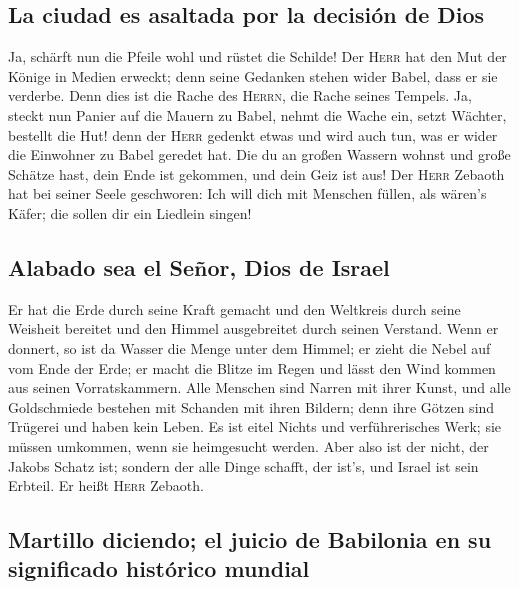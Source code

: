 \hypertarget{la-ciudad-es-asaltada-por-la-decisiuxf3n-de-dios}{%
\subsection{La ciudad es asaltada por la decisión de
Dios}\label{la-ciudad-es-asaltada-por-la-decisiuxf3n-de-dios}}

 Ja, schärft nun die Pfeile wohl und rüstet die Schilde!
Der \textsc{Herr} hat den Mut der Könige in Medien erweckt; denn seine
Gedanken stehen wider Babel, dass er sie verderbe. Denn dies ist die
Rache des \textsc{Herrn}, die Rache seines Tempels.  Ja,
steckt nun Panier auf die Mauern zu Babel, nehmt die Wache ein, setzt
Wächter, bestellt die Hut! denn der \textsc{Herr} gedenkt etwas und wird
auch tun, was er wider die Einwohner zu Babel geredet hat.
 Die du an großen Wassern wohnst und große Schätze hast,
dein Ende ist gekommen, und dein Geiz ist aus!  Der
\textsc{Herr} Zebaoth hat bei seiner Seele geschworen: Ich will dich mit
Menschen füllen, als wären's Käfer; die sollen dir ein Liedlein singen!

\hypertarget{alabado-sea-el-seuxf1or-dios-de-israel}{%
\subsection{Alabado sea el Señor, Dios de
Israel}\label{alabado-sea-el-seuxf1or-dios-de-israel}}

 Er hat die Erde durch seine Kraft gemacht und den
Weltkreis durch seine Weisheit bereitet und den Himmel ausgebreitet
durch seinen Verstand.  Wenn er donnert, so ist da Wasser
die Menge unter dem Himmel; er zieht die Nebel auf vom Ende der Erde; er
macht die Blitze im Regen und lässt den Wind kommen aus seinen
Vorratskammern.  Alle Menschen sind Narren mit ihrer
Kunst, und alle Goldschmiede bestehen mit Schanden mit ihren Bildern;
denn ihre Götzen sind Trügerei und haben kein Leben.  Es
ist eitel Nichts und verführerisches Werk; sie müssen umkommen, wenn sie
heimgesucht werden.  Aber also ist der nicht, der Jakobs
Schatz ist; sondern der alle Dinge schafft, der ist's, und Israel ist
sein Erbteil. Er heißt \textsc{Herr} Zebaoth.

\hypertarget{martillo-diciendo-el-juicio-de-babilonia-en-su-significado-histuxf3rico-mundial}{%
\subsection{Martillo diciendo; el juicio de Babilonia en su significado
histórico
mundial}\label{martillo-diciendo-el-juicio-de-babilonia-en-su-significado-histuxf3rico-mundial}}

